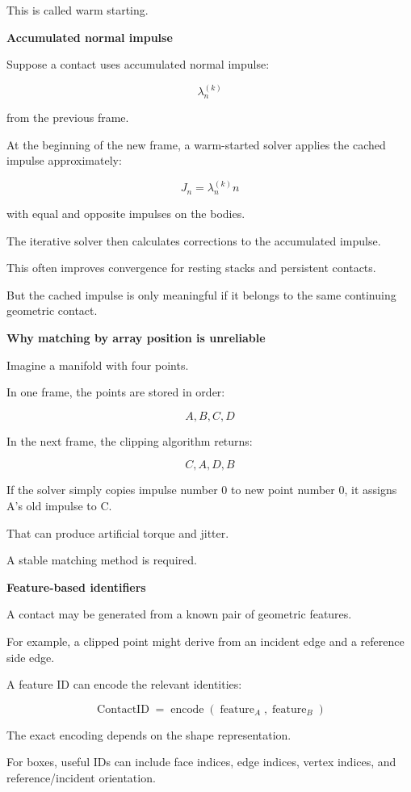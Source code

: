 This is called warm starting.

\textbf{Accumulated normal impulse}

Suppose a contact uses accumulated normal impulse:

\[
\lambda_n^{(k)}
\]

from the previous frame.

At the beginning of the new frame, a warm-started solver applies the cached impulse approximately:

\[
\boxed{ J_n=\lambda_n^{(k)}n }
\]

with equal and opposite impulses on the bodies.

The iterative solver then calculates corrections to the accumulated impulse.

This often improves convergence for resting stacks and persistent contacts.

But the cached impulse is only meaningful if it belongs to the same continuing geometric contact.

\textbf{Why matching by array position is unreliable}

Imagine a manifold with four points.

In one frame, the points are stored in order:

\[
A,B,C,D
\]

In the next frame, the clipping algorithm returns:

\[
C,A,D,B
\]

If the solver simply copies impulse number 0 to new point number 0, it assigns A's old impulse to C.

That can produce artificial torque and jitter.

A stable matching method is required.

\textbf{Feature-based identifiers}

A contact may be generated from a known pair of geometric features.

For example, a clipped point might derive from an incident edge and a reference side edge.

A feature ID can encode the relevant identities:

\[
\boxed{ \operatorname{ContactID} = \operatorname{encode}(\operatorname{feature}_A,\operatorname{feature}_B) }
\]

The exact encoding depends on the shape representation.

For boxes, useful IDs can include face indices, edge indices, vertex indices, and reference/incident orientation.

